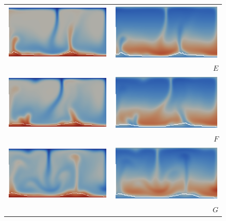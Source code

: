 \begin{figure}
\begin{center}
\begin{tabular}{c  r}
\includegraphics[width=0.45\columnwidth]{chapters/vynnytska/png/tmE.png} &
\includegraphics[width=0.45\columnwidth]{chapters/vynnytska/png/visE.png} \\& $E$ \\
\includegraphics[width=0.45\columnwidth]{chapters/vynnytska/png/tmF.png} &
\includegraphics[width=0.45\columnwidth]{chapters/vynnytska/png/visF.png} \\& $F$ \\
\includegraphics[width=0.45\columnwidth]{chapters/vynnytska/png/tmG.png} &
\includegraphics[width=0.45\columnwidth]{chapters/vynnytska/png/visG.png} \\& $G$ \\

\end{tabular}
\end{center}
\end{figure}
